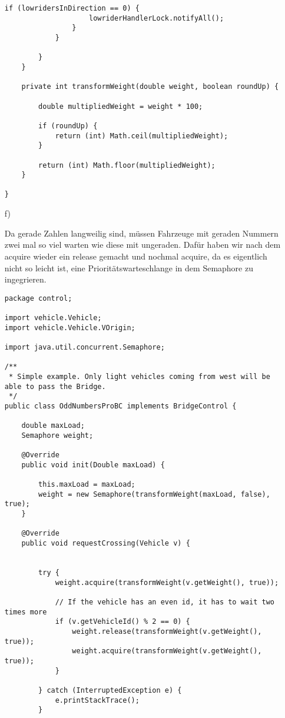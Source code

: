 \begin{itemize}
\begin{lstlisting}[style=java]
                if (lowridersInDirection == 0) {
                    lowriderHandlerLock.notifyAll();
                }
            }

        }
    }

    private int transformWeight(double weight, boolean roundUp) {

        double multipliedWeight = weight * 100;

        if (roundUp) {
            return (int) Math.ceil(multipliedWeight);
        }

        return (int) Math.floor(multipliedWeight);
    }

}

\end{lstlisting}

\item[f)]

Da gerade Zahlen langweilig sind, müssen Fahrzeuge mit geraden Nummern zwei mal so viel warten wie diese mit ungeraden. Dafür haben wir nach dem acquire wieder ein release gemacht und nochmal acquire, da es eigentlich nicht so leicht ist, eine Prioritätswarteschlange in dem Semaphore zu ingegrieren.

\begin{lstlisting}[style=java]
package control;

import vehicle.Vehicle;
import vehicle.Vehicle.VOrigin;

import java.util.concurrent.Semaphore;

/**
 * Simple example. Only light vehicles coming from west will be able to pass the Bridge.
 */
public class OddNumbersProBC implements BridgeControl {

    double maxLoad;
    Semaphore weight;

    @Override
    public void init(Double maxLoad) {

        this.maxLoad = maxLoad;
        weight = new Semaphore(transformWeight(maxLoad, false), true);
    }

    @Override
    public void requestCrossing(Vehicle v) {


        try {
            weight.acquire(transformWeight(v.getWeight(), true));

            // If the vehicle has an even id, it has to wait two times more
            if (v.getVehicleId() % 2 == 0) {
                weight.release(transformWeight(v.getWeight(), true));
                weight.acquire(transformWeight(v.getWeight(), true));
            }

        } catch (InterruptedException e) {
            e.printStackTrace();
        }


\end{lstlisting}
\end{itemize}
